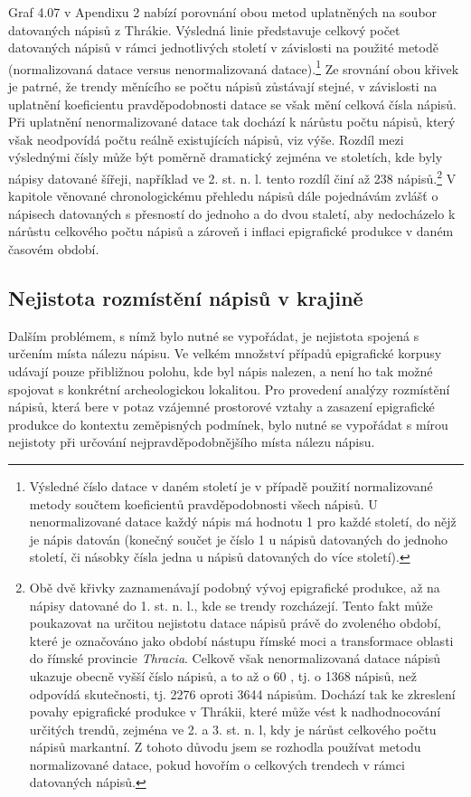 Graf 4.07 v Apendixu 2 nabízí porovnání obou metod uplatněných na soubor datovaných nápisů z Thrákie. Výsledná linie představuje celkový počet datovaných nápisů v rámci jednotlivých století v závislosti na použité metodě (normalizovaná datace versus nenormalizovaná datace).\footnote{Výsledné číslo datace v daném století je v případě použití normalizované metody součtem koeficientů pravděpodobnosti všech nápisů. U nenormalizované datace každý nápis má hodnotu 1 pro každé století, do nějž je nápis datován (konečný součet je číslo 1 u nápisů datovaných do jednoho století, či násobky čísla jedna u nápisů datovaných do více století).} Ze srovnání obou křivek je patrné, že trendy měnícího se počtu nápisů zůstávají stejné, v závislosti na uplatnění koeficientu pravděpodobnosti datace se však mění celková čísla nápisů. Při uplatnění nenormalizované datace tak dochází k nárůstu počtu nápisů, který však neodpovídá počtu reálně existujících nápisů, viz výše. Rozdíl mezi výslednými čísly může být poměrně dramatický zejména ve stoletích, kde byly nápisy datované šířeji, například ve 2. st. n. l. tento rozdíl činí až 238 nápisů.\footnote{Obě dvě křivky zaznamenávají podobný vývoj epigrafické produkce, až na nápisy datované do 1. st. n. l., kde se trendy rozcházejí. Tento fakt může poukazovat na určitou nejistotu datace nápisů právě do zvoleného období, které je označováno jako období nástupu římské moci a transformace oblasti do římské provincie {\em Thracia}. Celkově však nenormalizovaná datace nápisů ukazuje obecně vyšší číslo nápisů, a to až o 60 , tj. o 1368 nápisů, než odpovídá skutečnosti, tj. 2276 oproti 3644 nápisům. Dochází tak ke zkreslení povahy epigrafické produkce v Thrákii, které může vést k nadhodnocování určitých trendů, zejména ve 2. a 3. st. n. l, kdy je nárůst celkového počtu nápisů markantní. Z tohoto důvodu jsem se rozhodla používat metodu normalizované datace, pokud hovořím o celkových trendech v rámci datovaných nápisů.} V kapitole věnované chronologickému přehledu nápisů dále pojednávám zvlášť o nápisech datovaných s přesností do jednoho a do dvou staletí, aby nedocházelo k nárůstu celkového počtu nápisů a zároveň i inflaci epigrafické produkce v daném časovém období.

\subsection[nejistota-rozmístění-nápisů-v-krajině]{Nejistota rozmístění nápisů v krajině}

Dalším problémem, s nímž bylo nutné se vypořádat, je nejistota spojená s určením místa nálezu nápisu. Ve velkém množství případů epigrafické korpusy udávají pouze přibližnou polohu, kde byl nápis nalezen, a není ho tak možné spojovat s konkrétní archeologickou lokalitou. Pro provedení analýzy rozmístění nápisů, která bere v potaz vzájemné prostorové vztahy a zasazení epigrafické produkce do kontextu zeměpisných podmínek, bylo nutné se vypořádat s mírou nejistoty při určování nejpravděpodobnějšího místa nálezu nápisu.

